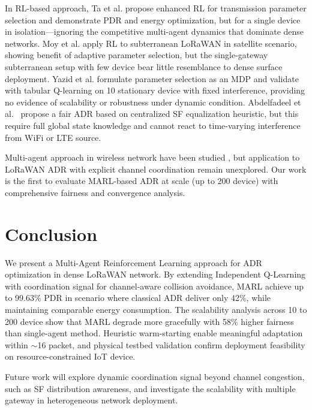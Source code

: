 \documentclass[conference]{IEEEtran}
\begin{document}
In RL-based approach, Ta et al. \cite{ta2023enhanced} propose enhanced RL for transmission parameter selection and demonstrate PDR and energy optimization, but for a single device in isolation---ignoring the competitive multi-agent dynamics that dominate dense networks. Moy et al. \cite{moy2024energy} apply RL to subterranean LoRaWAN in satellite scenario, showing benefit of adaptive parameter selection, but the single-gateway subterranean setup with few device bear little resemblance to dense surface deployment. Yazid et al. \cite{yazid2022rl} formulate parameter selection as an MDP and validate with tabular Q-learning on 10 stationary device with fixed interference, providing no evidence of scalability or robustness under dynamic condition. Abdelfadeel et al.~\cite{abdelfadeel2020machine} propose a fair ADR based on centralized SF equalization heuristic, but this require full global state knowledge and cannot react to time-varying interference from WiFi or LTE source.

Multi-agent approach in wireless network have been studied \cite{littman1994markov, luong2019applications}, but application to LoRaWAN ADR with explicit channel coordination remain unexplored. Our work is the first to evaluate MARL-based ADR at scale (up to 200 device) with comprehensive fairness and convergence analysis.

\section{Conclusion}
\label{sec:conclusion}

We present a Multi-Agent Reinforcement Learning approach for ADR optimization in dense LoRaWAN network. By extending Independent Q-Learning with coordination signal for channel-aware collision avoidance, MARL achieve up to 99.63\% PDR in scenario where classical ADR deliver only 42\%, while maintaining comparable energy consumption. The scalability analysis across 10 to 200 device show that MARL degrade more gracefully with 58\% higher fairness than single-agent method. Heuristic warm-starting enable meaningful adaptation within $\sim$16 packet, and physical testbed validation confirm deployment feasibility on resource-constrained IoT device.

Future work will explore dynamic coordination signal beyond channel congestion, such as SF distribution awareness, and investigate the scalability with multiple gateway in heterogeneous network deployment.
\end{document}
